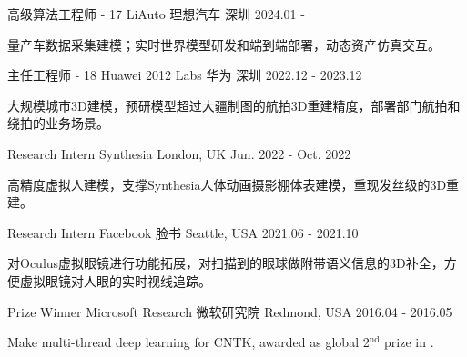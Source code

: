 


\begin{cventries}

\cventry
{高级算法工程师 - 17} %
{LiAuto 理想汽车} %
{深圳} %
{2024.01 - } %
{ %
\begin{cvitems}
\item {量产车数据采集建模；实时世界模型研发和端到端部署，动态资产仿真交互。}
\end{cvitems}
}

\cventry
{主任工程师 - 18} %
{Huawei 2012 Labs 华为} %
{深圳} %
{2022.12 - 2023.12} %
{ %
\begin{cvitems}
\item {大规模城市3D建模，预研模型超过大疆制图的航拍3D重建精度，部署部门航拍和绕拍的业务场景。}
\end{cvitems}
}

\cventry
{Research Intern} %
{Synthesia} %
{London, UK} %
{Jun. 2022 - Oct. 2022} %
{ %
\begin{cvitems}
\item {高精度虚拟人建模，支撑Synthesia人体动画摄影棚体表建模，重现发丝级的3D重建。}
\end{cvitems}
}

\cventry
{Research Intern} %
{Facebook 脸书} %
{Seattle, USA} %
{2021.06 - 2021.10} %
{ %
\begin{cvitems}
\item {对Oculus虚拟眼镜进行功能拓展，对扫描到的眼球做附带语义信息的3D补全，方便虚拟眼镜对人眼的实时视线追踪。}
\end{cvitems}
}

\cventry
{Prize Winner} %
{Microsoft Research 微软研究院} %
{Redmond, USA} %
{2016.04 - 2016.05} %
{ %
\begin{cvitems}
\item {Make multi-thread deep learning for CNTK, awarded as global 2$^\text{nd}$ prize in \href{https://www.microsoft.com/en-us/research/academic-program/microsoft-open-source-challenge/}{}.} %
\end{cvitems}
}


\end{cventries}
